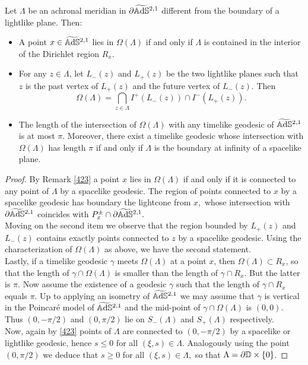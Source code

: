 \begin{proposition}\label{432}
    Let $\Lambda$ be an achronal meridian in $\partial\widetilde{\mathbb{A}\mathrm{d}\mathbb{S}}{}^{2,1}$ different from the boundary of a lightlike plane. Then: 
        \begin{itemize}
            \item A point $x\in\widetilde{\mathbb{A}\mathrm{d}\mathbb{S}}{}^{2,1}$ lies in $\Omega(\Lambda)$ if and only if $\Lambda$ is contained in the interior of the Dirichlet region $R_x$. 
            \item For any $z\in\Lambda$, let $L_-(z)$ and $L_+(z)$ be the two lightlike planes such that $z$ is the past vertex of $L_+(z)$ and the future vertex of $L_-(z)$. Then 
            \[
                \Omega(\Lambda)=\bigcap_{z\in\Lambda}I^+(L_-(z))\cap I^{-}(L_+(z)).
            \] 
            \item The length of the intersection of $\Omega(\Lambda)$ with any timelike geodesic of $\widetilde{\mathbb{A}\mathrm{d}\mathbb{S}}{}^{2,1}$ is at most $\pi.$ Moreover, there exist a timelike geodesic whose intersection with $\Omega(\Lambda)$ has length $\pi$ if and only if $\Lambda$ is the boundary at infinity of a spacelike plane. 
        \end{itemize}
\end{proposition}
\begin{proof}
    By Remark \ref{423} a point $x$ lies in $\Omega(\Lambda)$ if and only if it is connected to any point of $\Lambda$ by a spacelike geodesic. The region of points connected to $x$ by a spacelike geodesic has boundary the lightcone from $x,$ whose intersection with $\partial\widetilde{\mathbb{A}\mathrm{d}\mathbb{S}}{}^{2,1}$ coincides with $P_x^\pm\cap \partial\widetilde{\mathbb{A}\mathrm{d}\mathbb{S}}{}^{2,1}.$\\
    Moving on the second item we observe that the region bounded by $L_+(z)$ and $L_-(z)$ contains exactly points connected to $z$ by a spacelike geodesic. Using the characterization of $\Omega(\Lambda)$ as above, we have the second statement.   \\
    Lastly, if a timelike geodesic $\gamma$ meets $\Omega(\Lambda)$ at a point $x$, then $\Omega(\Lambda)\subset R_x$, so that the length of $\gamma\cap\Omega(\Lambda)$ is smaller than the length of $\gamma\cap R_x$. But the latter is $\pi.$ Now assume the existence of a geodesic $\gamma$ such that the length of $\gamma\cap R_x$ equals $\pi.$ Up to applying an isometry of $\widetilde{\mathbb{A}\mathrm{d}\mathbb{S}}{}^{2,1}$ we may assume that $\gamma$ is vertical in the Poincaré model of $\widetilde{\mathbb{A}\mathrm{d}\mathbb{S}}{}^{2,1}$ and the mid-point of $\gamma\cap\Omega(\Lambda)$ is $(0,0)$. Thus $(0,-\pi/2)$ and $(0,\pi/2)$ lie on $S_-(\Lambda)$ and $S_+(\Lambda)$ respectively. \\
    Now, again by \ref{423} points of $\Lambda$ are connected to $(0,-\pi/2)$ by a spacelike or lightlike geodesic, hence $s\leq 0$ for all $(\xi,s)\in\Lambda.$ Analogously using the point $(0,\pi/2)$ we deduce that $s\geq 0$ for all $(\xi,s)\in\Lambda,$ so that $\Lambda=\partial\mathbb{D}\times\{0\}$.
\end{proof}

